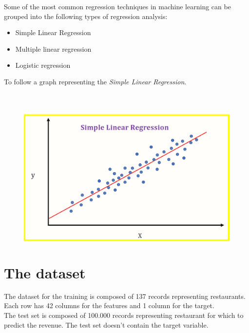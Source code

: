 \documentclass[a4paper,10pt]{report}
\begin{document}
Some of the most common regression techniques in machine learning can be grouped into the following types of regression analysis: 
\begin{itemize}
\item Simple Linear Regression 
\item Multiple linear regression 
\item Logistic regression 
\end{itemize}
To follow a graph representing the \emph{Simple Linear Regression}.
\\
\\
\\
\begin{figure}[H]
    \includegraphics[width = 350pt]{img/simplelinregr.png}
  \end{figure} 
\chapter{The dataset}
The dataset for the training is composed of 137 records representing restaurants.\\
Each row has 42 columns for the features and 1 column for the target.\\
The test set is composed of 100.000 records representing restaurant for which to predict the revenue. The test set doesn't contain the target variable.\\
\end{document}
